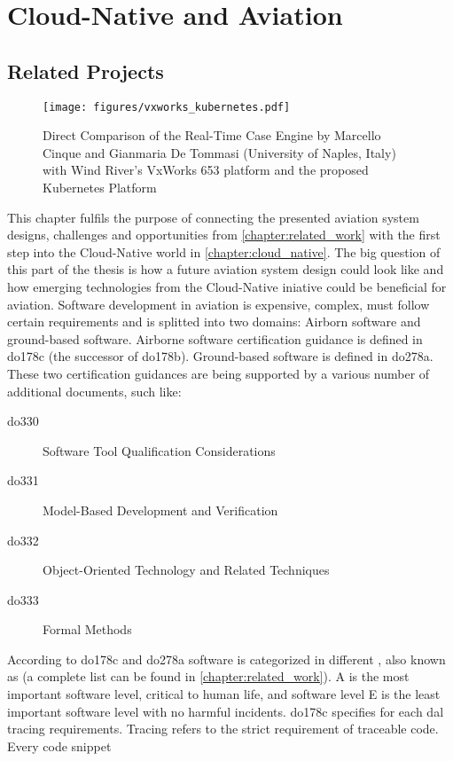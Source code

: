 \documentclass[titlepage]{report}
\begin{document}
\chapter{Cloud-Native and Aviation}
\section{Related Projects}
\begin{figure}[H]
  \centering
  \texttt{[image: figures/vxworks\_kubernetes.pdf]}
  \caption{Direct Comparison of the Real-Time Case Engine by Marcello Cinque and Gianmaria De Tommasi (University of Naples, Italy) with Wind River's VxWorks 653 platform and the proposed Kubernetes Platform\cite{cinque2017work}\cite{VXWorks653}\cite{VXWorks653Platform}}\label{fig:vxworks_kubernetes}
\end{figure}
This chapter fulfils the purpose of connecting the presented aviation system designs, challenges and opportunities from \autoref{chapter:related_work} with the first step into the Cloud-Native world in \autoref{chapter:cloud_native}.
The big question of this part of the thesis is how a future aviation system design could look like and how emerging technologies from the Cloud-Native iniative could be beneficial for aviation. Software development in aviation is expensive,
complex, must follow certain requirements and is splitted into two domains: Airborn software and ground-based software. Airborne software certification guidance is defined in \gls{do178c} (the successor of \gls{do178b}).
Ground-based software is defined in \gls{do278a}. These two certification guidances are being supported by a various number of additional documents, such like:
\begin{description}
  \item[\gls{do330}] Software Tool Qualification Considerations
  \item[\gls{do331}] Model-Based Development and Verification
  \item[\gls{do332}] Object-Oriented Technology and Related Techniques
  \item[\gls{do333}] Formal Methods
\end{description}
According to \gls{do178c} and \gls{do278a} software is categorized in different , also known as  (a complete list can be found in \autoref{chapter:related_work}). A is the most important software level, critical to
human life, and software level E is the least important software level with no harmful incidents. \gls{do178c} specifies for each \gls{dal} tracing requirements. Tracing refers to the strict requirement of traceable code. Every code snippet
\end{document}
